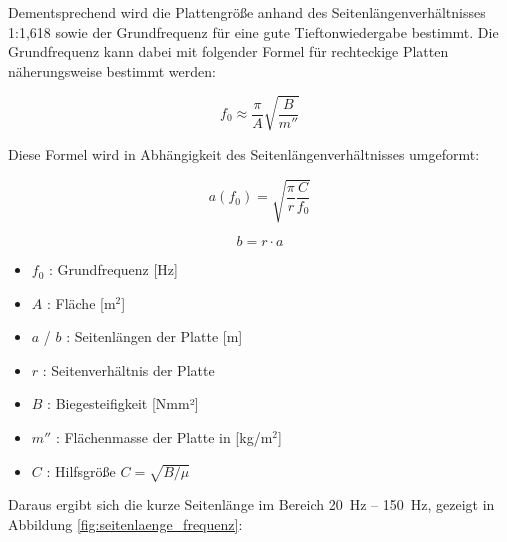 Dementsprechend wird die Plattengröße anhand des Seitenlängenverhältnisses 1:1,618 sowie der Grundfrequenz für eine gute Tieftonwiedergabe bestimmt. Die Grundfrequenz kann dabei mit folgender Formel für rechteckige Platten näherungsweise bestimmt werden: 

\begin{equation}
f_0 \approx \frac{\pi}{A}\sqrt{\frac{B}{m''}}
\end{equation}

Diese Formel wird in Abhängigkeit des Seitenlängenverhältnisses umgeformt:

\begin{equation}
a(f_0) = \sqrt{\frac{\pi}{r}\frac{C}{f_0}}
\end{equation}

\begin{equation}
b = r \cdot a
\end{equation}

\begin{itemize}
    \item $f_0$ : Grundfrequenz [Hz]
    \item $A$ : Fläche [m$^2$]
    \item $a$ / $b$ : Seitenlängen der Platte [m]
    \item $r$ : Seitenverhältnis der Platte
    \item $B$ : Biegesteifigkeit [Nmm²]
    \item $m''$ : Flächenmasse der Platte in [kg/m$^2$]
    \item $C$ : Hilfsgröße $C = \sqrt{B/\mu}$
\end{itemize}

Daraus ergibt sich die kurze Seitenlänge im Bereich \SI{20}{\hertz} -- \SI{150}{\hertz}, gezeigt in Abbildung \ref{fig:seitenlaenge_frequenz}:

